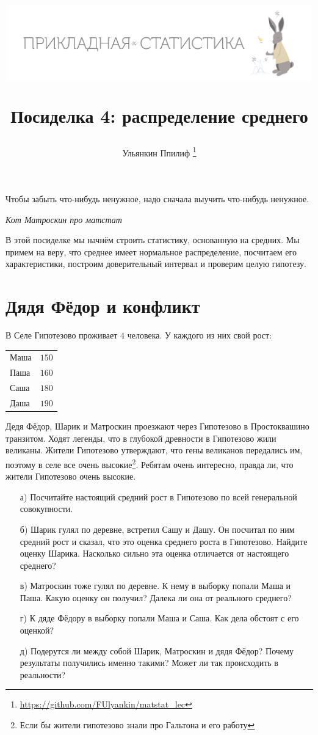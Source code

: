 \documentclass[12pt, a4paper, oneside]{article}
\title{
\begin{center} 
\includegraphics[width=0.99\textwidth]{logo.png}
\end{center}

Посиделка 4: распределение среднего}
\date{ } %
\author{Ульянкин Ппилиф \thanks{\url{https://github.com/FUlyankin/matstat_lec}}}
\begin{document}

\maketitle

\epigraph{Чтобы забыть что-нибудь ненужное, надо сначала выучить что-нибудь ненужное.}{\textit{Кот Матроскин про матстат}}

В этой посиделке мы начнём строить статистику, основанную на средних. Мы примем на веру, что среднее имеет нормальное распределение, посчитаем его характеристики, построим доверительный интервал и проверим целую гипотезу.  

\section{Дядя Фёдор и конфликт}

В Селе  Гипотезово проживает $4$ человека. У каждого из них свой рост:

\begin{center}
	\begin{tabular}{lc}
		\toprule
		Маша &  $150$\\
		Паша &  $160$\\
		Саша &  $180$\\
		Даша &  $190$\\ 
		\bottomrule
	\end{tabular}	
\end{center}

Дедя Фёдор, Шарик и Матроскин проезжают через Гипотезово в Простоквашино транзитом. Ходят легенды, что в глубокой древности в Гипотезово жили великаны. Жители Гипотезово утверждают, что гены великанов передались им, поэтому в селе все очень высокие\footnote{Если бы жители гипотезово знали про Гальтона и его работу }. Ребятам очень интересно, правда ли, что жители Гипотезово очень высокие.

\begin{enumerate} 
	\item[а)] Посчитайте настоящий средний рост в Гипотезово по всей генеральной совокупности.
	\item[б)] Шарик гулял по деревне, встретил Сашу и Дашу. Он посчитал по ним средний рост и сказал, что это оценка среднего роста в Гипотезово. Найдите оценку Шарика. Насколько сильно эта оценка отличается от настоящего среднего? 
	\item[в)] Матроскин тоже гулял по деревне. К нему в выборку попали Маша и Паша. Какую оценку он получил? Далека ли она от реального среднего? 
	\item[г)] К дяде Фёдору в выборку попали Маша и Саша. Как дела обстоят с его оценкой? 
	\item[д)] Подерутся ли между собой Шарик, Матроскин и дядя Фёдор? Почему результаты получились именно такими? Может ли так происходить в реальности? 
\end{enumerate} 
\end{document}
